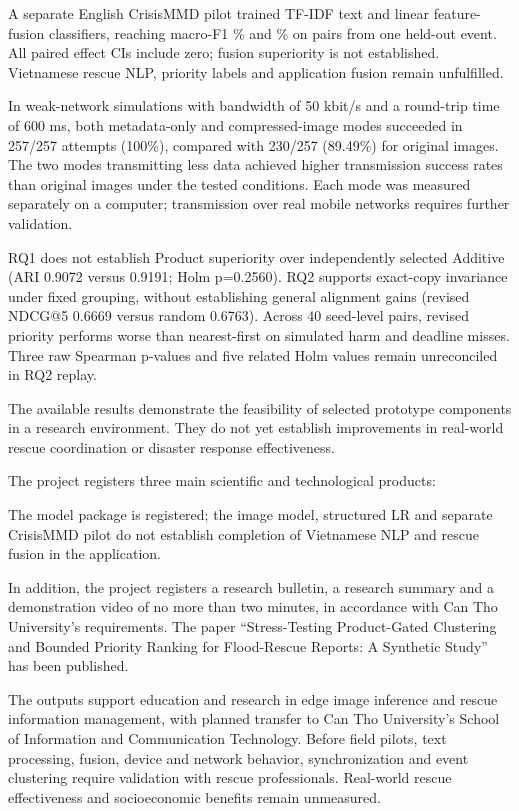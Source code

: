 A separate English CrisisMMD pilot trained TF-IDF text and linear feature-fusion classifiers, reaching macro-F1 \MMTextFOne\% and \MMFusionFOne\% on \MMTestN{} pairs from one held-out event. All paired effect CIs include zero; fusion superiority is not established. Vietnamese rescue NLP, priority labels and application fusion remain unfulfilled.

In weak-network simulations with bandwidth of 50 kbit/s and a round-trip time of 600 ms, both metadata-only and compressed-image modes succeeded in 257/257 attempts (100\%), compared with 230/257 (89.49\%) for original images. The two modes transmitting less data achieved higher transmission success rates than original images under the tested conditions. Each mode was measured separately on a computer; transmission over real mobile networks requires further validation.

RQ1 does not establish Product superiority over independently selected Additive (ARI 0.9072 versus 0.9191; Holm p=0.2560). RQ2 supports exact-copy invariance under fixed grouping, without establishing general alignment gains (revised NDCG@5 0.6669 versus random 0.6763). Across 40 seed-level pairs, revised priority performs worse than nearest-first on simulated harm and deadline misses. Three raw Spearman p-values and five related Holm values remain unreconciled in RQ2 replay.

The available results demonstrate the feasibility of selected prototype components in a research environment. They do not yet establish improvements in real-world rescue coordination or disaster response effectiveness.

The project registers three main scientific and technological products:
\par\noindent The model package is registered; the image model, structured LR and separate CrisisMMD pilot do not establish completion of Vietnamese NLP and rescue fusion in the application.
\par\noindent In addition, the project registers a research bulletin, a research summary and a demonstration video of no more than two minutes, in accordance with Can Tho University's requirements. The paper ``Stress-Testing Product-Gated Clustering and Bounded Priority Ranking for Flood-Rescue Reports: A Synthetic Study'' has been published.

The outputs support education and research in edge image inference and rescue information management, with planned transfer to Can Tho University's School of Information and Communication Technology. Before field pilots, text processing, fusion, device and network behavior, synchronization and event clustering require validation with rescue professionals. Real-world rescue effectiveness and socioeconomic benefits remain unmeasured.

